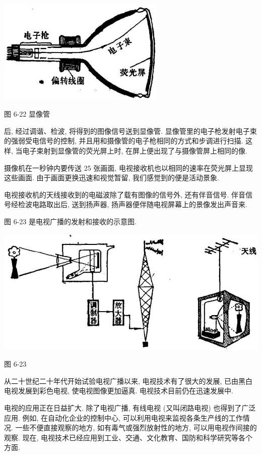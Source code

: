 \documentclass[10pt]{article}
\begin{document}
\begin{center}
\includegraphics[max width=0.6\textwidth]{images/01913056-1f15-74d8-9184-9aab52c9d66b_214_438344.jpg}
\end{center}

图 6-22 显像管

后, 经过调谐、检波, 将得到的图像信号送到显像管. 显像管里的电子枪发射电子束的强弱受电信号的控制, 并且用和摄像管的电子枪相同的方式和步调进行扫描. 这样, 当电子束射到显像管的荧光屏上时, 在屏上便出现了与摄像管屏上相同的像.

摄像机在一秒钟内要传送 25 张画面, 电视接收机也以相同的速率在荧光屏上显现这些画面. 由于画面更换迅速和视觉暂留, 我们感觉到的便是活动景象.

电视接收机的天线接收到的电磁波除了载有图像的信号外, 还有伴音信号. 伴音信号经检波电路取出后, 送到扬声器, 扬声器便伴随电视屏幕上的景像发出声音来.

图 6-23 是电视广播的发射和接收的示意图.

\begin{center}
\includegraphics[max width=1.0\textwidth]{images/01913056-1f15-74d8-9184-9aab52c9d66b_215_398371.jpg}
\end{center}

图 6-23

从二十世纪二十年代开始试验电视广播以来, 电视技术有了很大的发展, 已由黑白电视发展到彩色电视, 使电视图像更加逼真. 电视技术目前仍在迅速发展中.

电视的应用正在日益扩大. 除了电视广播, 有线电视 (又叫闭路电视) 也得到了广泛应用. 例如, 在自动化企业的控制中心, 可以利用电视来监视各条生产线的工作情况. 一些不便直接观察的地方, 如有毒气或强烈放射性的地方, 可以用电视作间接的观察. 现在, 电视技术已经应用到工业、交通、文化教育、国防和科学研究等各个方面.
\end{document}
